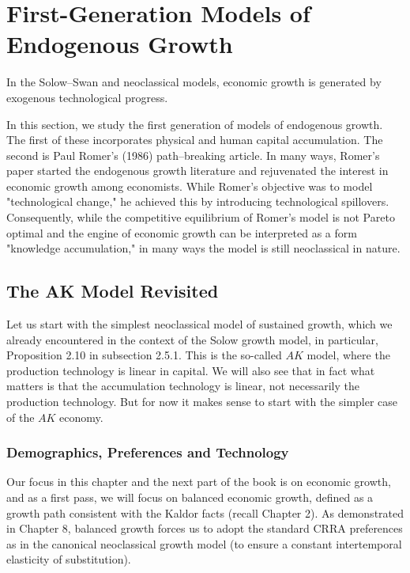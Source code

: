 \documentclass[\topdir/lecture\_notes.tex]{subfiles}
\begin{document}
\captionsetup{singlelinecheck=false}

\section{First-Generation Models of Endogenous Growth}
In the Solow--Swan and neoclassical models, economic growth is generated by exogenous technological progress. 

In this section, we study the first generation of models of endogenous growth. The first of these incorporates physical and human capital accumulation. The second is Paul Romer's (1986) path--breaking article. In many ways, Romer's paper started the endogenous growth literature and rejuvenated the interest in economic growth among economists. While Romer's objective was to model "technological change," he achieved this by introducing technological spillovers. Consequently, while the competitive equilibrium of Romer's model is not Pareto optimal and the engine of economic growth can be interpreted as a form "knowledge accumulation," in many ways the model is still neoclassical in nature.

\subsection{The AK Model Revisited}
Let us start with the simplest neoclassical model of sustained growth, which we already encountered in the context of the Solow growth model, in particular, Proposition 2.10 in subsection 2.5.1. This is the so-called $AK$ model, where the production technology is linear in capital. We will also see that in fact what matters is that the accumulation technology is linear, not necessarily the production technology. But for now it makes sense to start with the simpler case of the $AK$ economy.

\subsubsection{Demographics, Preferences and Technology}
Our focus in this chapter and the next part of the book is on economic growth, and as a first pass, we will focus on balanced economic growth, defined as a growth path consistent with the Kaldor facts (recall Chapter 2). As demonstrated in Chapter 8, balanced growth forces us to adopt the standard CRRA preferences as in the canonical neoclassical growth model (to ensure a constant intertemporal elasticity of substitution).
\end{document}
